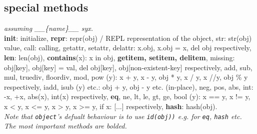 \documentclass[]{article}
\begin{document}
\begin{multicols}{2}
		\subsection{special methods}
		\textit{assuming \_\_\{name\}\_\_ syx.} \\
		\textbf{init}: initialize, \textbf{repr}: repr(obj) / REPL representation of the object, str: str(obj) value, call: calling, getattr, setattr, delattr: x.obj, x.obj = x, del obj respectively, \textbf{len}: len(obj), \textbf{contains}(x): x in obj, \textbf{getitem, setitem, delitem}, missing: obj[key], obj[key] = val, del obj[key], obj[non-existent-key] respectively, add, sub, mul, truediv, floordiv, mod, pow (y): x + y, x - y, obj * y, x / y, x //y, obj \% y respectively, iadd, isub (y) etc.: obj + y, obj - y etc. (in-place), neg, pos, abs, int: -x, +x, abs(x), int(x) respectively, \textbf{eq}, ne, lt, le, gt, ge, bool (y): x == y, x != y, x < y, x <= y, x > y, x >= y, if x: [...] respectively, \textbf{hash}: hash(obj). \\
		\textit{Note that \texttt{object}'s defualt behaviour is to use \texttt{id(obj))} e.g. for \texttt{eq}, \texttt{hash} etc. } \\
		\textit{The most important methods are bolded. }
		
	\end{multicols}
	
	
\end{document}
